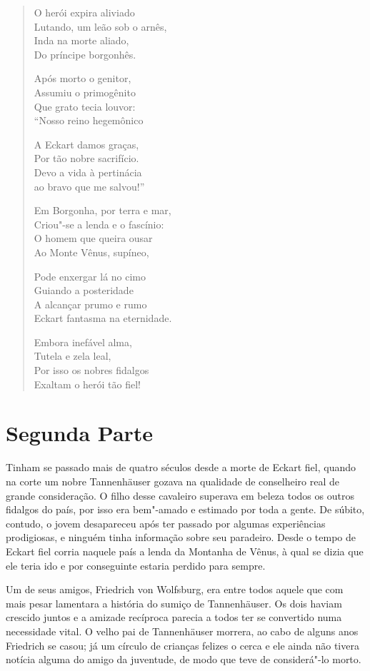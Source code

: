 \begin{verse}
O herói expira aliviado\\
Lutando, um leão sob o arnês,\\
Inda na morte aliado,\\
Do príncipe borgonhês.

Após morto o genitor,\\
Assumiu o primogênito\\
Que grato tecia louvor:\\
``Nosso reino hegemônico
 
A Eckart damos graças,\\
Por tão nobre sacrifício.\\
Devo a vida à pertinácia\\
ao bravo que me salvou!''

Em Borgonha, por terra e mar,\\
Criou"-se a lenda e o fascínio:\\
O homem que queira ousar\\
Ao Monte Vênus, supíneo,

Pode enxergar lá no cimo\\
Guiando a posteridade\\
A alcançar prumo e rumo\\
Eckart fantasma na eternidade.

Embora inefável alma,\\
Tutela e zela leal,\\
Por isso os nobres fidalgos\\
Exaltam o herói tão fiel!
\end{verse}


\section{Segunda Parte}

Tinham se passado mais de quatro séculos desde a morte de Eckart fiel,
quando na corte um nobre \mbox{Tannenhäuser} gozava na qualidade de
conselheiro real de grande consideração. O filho desse cavaleiro
superava em beleza todos os outros fidalgos do país, por isso era
bem"-amado e estimado por toda a gente. De súbito, contudo, o jovem
desapareceu após ter passado por algumas experiências prodigiosas, e
ninguém tinha informação sobre seu paradeiro. Desde o tempo de Eckart
fiel corria naquele país a lenda da Montanha de Vênus, à qual se dizia
que ele teria ido e por conseguinte estaria perdido para sempre.

Um de seus amigos, Friedrich von Wolfsburg, era entre todos aquele que
com mais pesar lamentara a história do sumiço de Tannenhäuser. Os dois
haviam crescido juntos e a amizade recíproca parecia a todos ter se
convertido numa necessidade vital. O velho pai de Tannenhäuser morrera,
ao cabo de alguns anos Friedrich se casou; já um círculo de crianças
felizes o cerca e ele ainda não tivera notícia alguma do amigo da
juventude, de modo que teve de considerá"-lo morto.

